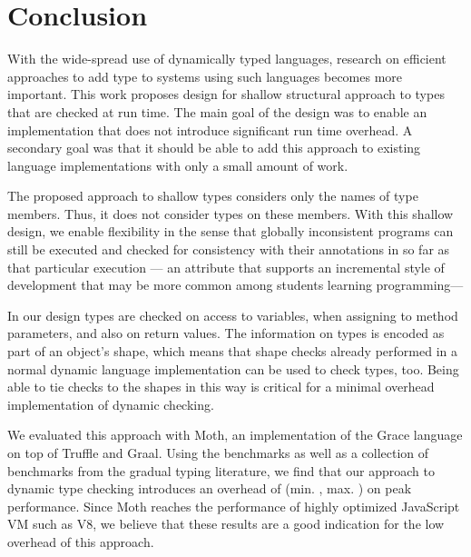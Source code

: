 
\section{Conclusion}
\label{sec:conclusion}

With the wide-spread use of dynamically typed languages,
research on efficient approaches to add type to systems using such languages
becomes more important.
%
This work proposes design for shallow structural approach to types
that are checked at run time.
The main goal of the design was to enable an implementation that
does not introduce significant run time overhead.
A secondary goal was that it should be able to add this approach to
existing language implementations with only a small amount of work.


The proposed approach to shallow types considers only the names of type members.
Thus, it does not consider types on these members.
With this shallow design, we enable flexibility in the sense that
globally inconsistent programs can still be executed and
checked for consistency with their annotations in so far as
that particular execution%
--- an attribute that supports an incremental style of development
that may be more common among students learning programming---%

In our design types are checked on access to variables,
when assigning to method parameters, and also on return values.
The information on types is encoded as part of an object's shape,
which means that shape checks already performed in a normal dynamic
language implementation can be used to check types, too. 
Being able to tie checks to the shapes in this way is critical for 
a minimal overhead implementation of dynamic checking.

We evaluated this approach with Moth, an implementation of the Grace language
on top of Truffle and Graal.
Using the \AWFY benchmarks as well as a collection of benchmarks from the
gradual typing literature, we find that our approach to dynamic type checking
introduces an overhead of 
\OverheadTypingGMeanP (min. \OverheadTypingMinP, max. \OverheadTypingMaxP)
on peak performance.
Since Moth reaches the performance of highly optimized JavaScript VM such as V8,
we believe that these results are a good indication for the low overhead of this
approach.

